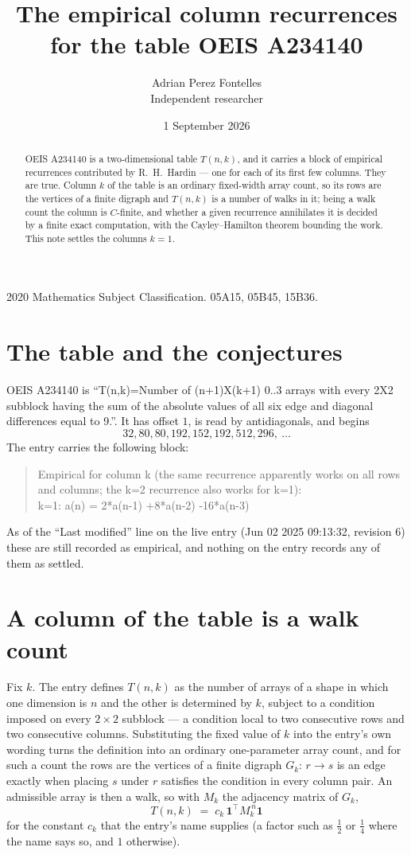 \documentclass[11pt,a4paper]{article}
\title{The empirical column recurrences for the table OEIS A234140}
\author{Adrian Perez Fontelles\\ \small Independent researcher}
\date{1 September 2026}
\theoremstyle{plain}
\theoremstyle{definition}
\begin{document}
\maketitle

\begin{abstract}
OEIS A234140 is a two-dimensional table $T(n,k)$, and it carries a block of empirical
recurrences contributed by R.~H.~Hardin --- one for each of its first few columns. They are
true. Column $k$ of the table is an ordinary fixed-width array count, so its rows are the
vertices of a finite digraph and $T(n,k)$ is a number of walks in it; being a walk count the
column is $C$-finite, and whether a given recurrence annihilates it is decided by a finite
exact computation, with the Cayley--Hamilton theorem bounding the work. This note settles the
columns $k=1$.
\end{abstract}

\noindent\small 2020 Mathematics Subject Classification. 05A15, 05B45, 15B36.\normalsize

\section{The table and the conjectures}

OEIS A234140 is ``T(n,k)=Number of (n+1)X(k+1) 0..3 arrays with every 2X2 subblock having the sum of the absolute values of all six edge and diagonal differences equal to 9.''. It has offset $1$, is
read by antidiagonals, and begins
\[
32, 80, 80, 192, 152, 192, 512, 296,\ \dots
\]
The entry carries the following block:
\begin{quote}\small
Empirical for column k (the same recurrence apparently works on all rows and columns; the k=2 recurrence also works for k=1):\\
k=1: a(n) = 2*a(n-1) +8*a(n-2) -16*a(n-3)\\
\end{quote}
As of the ``Last modified'' line on the live entry (Jun 02 2025 09:13:32, revision 6) these are still
recorded as empirical, and nothing on the entry records any of them as settled.

\section{A column of the table is a walk count}

Fix $k$. The entry defines $T(n,k)$ as the number of arrays of a shape in which one dimension
is $n$ and the other is determined by $k$, subject to a condition imposed on every
$2\times2$ subblock --- a condition local to two consecutive rows and two consecutive columns.
Substituting the fixed value of $k$ into the entry's own wording turns the definition into an
ordinary one-parameter array count, and for such a count the rows are the vertices of a finite
digraph $G_k$: $r\to s$ is an edge exactly when placing $s$ under $r$ satisfies the condition
in every column pair. An admissible array is then a walk, so with $M_k$ the adjacency matrix
of $G_k$,
\[
T(n,k)\;=\;c_k\,\mathbf{1}^{\!\top}M_k^{\,n}\mathbf{1}
\]
for the constant $c_k$ that the entry's name supplies (a factor such as $\tfrac12$ or
$\tfrac14$ where the name says so, and $1$ otherwise).
\end{document}
